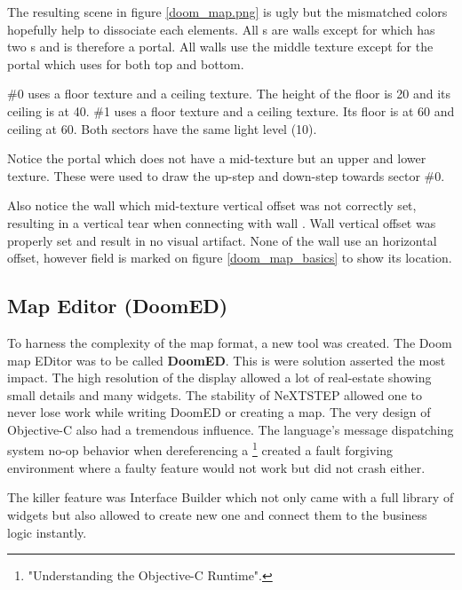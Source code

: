 \par
The resulting scene in figure \ref{doom_map.png} is ugly but the mismatched colors hopefully help to dissociate each elements. All s are walls except for  which has two s and is therefore a portal. All walls use the  middle texture except for the portal which uses  for both top and bottom.\\
\par
{} \#0 uses a  floor texture and a  ceiling texture. The height of the floor is 20 and its ceiling is at 40.  \#1 uses a  floor texture and a  ceiling texture. Its floor is at 60 and ceiling at 60. Both sectors have the same light level (10).\\
\par
   Notice the portal  which does not have a mid-texture but an upper and lower texture. These were used to draw the up-step and down-step towards sector \#0.\\
\par
Also notice the wall  which mid-texture vertical offset was not correctly set, resulting in a vertical tear when connecting with wall . Wall  vertical offset was properly set and result in no visual artifact. None of the wall use an horizontal offset, however field is marked  on figure \ref{doom_map_basics} to show its location.\\ 
\pagebreak



\subsection{Map Editor (DoomED)}
To harness the complexity of the map format, a new tool was created. The Doom map EDitor was to be called \textbf{DoomED}. This is were \NeXT solution asserted the most impact. The high resolution of the display allowed a lot of real-estate showing small details and many widgets. The stability of NeXTSTEP allowed one to never lose work while writing DoomED or creating a map.
The very design of Objective-C also had a tremendous influence. The language's message dispatching system no-op behavior when dereferencing a \footnote{"Understanding the Objective-C Runtime".} created a fault forgiving environment where a faulty feature would not work but did not crash either.\\
\par   
The killer feature was Interface Builder which not only came with a full library of widgets but also allowed to create new one and connect them to the business logic instantly.\\
\par
{}
\par

